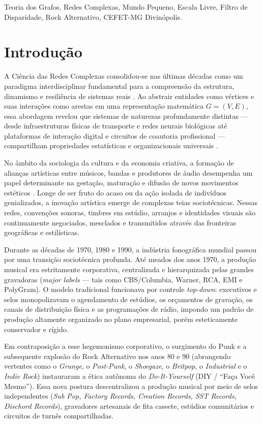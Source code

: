 \documentclass[conference]{IEEEtran}
\begin{document}
\begin{IEEEkeywords}
Teoria dos Grafos, Redes Complexas, Mundo Pequeno, Escala Livre, Filtro de Disparidade, Rock Alternativo, CEFET-MG Divinópolis.
\end{IEEEkeywords}

\section{Introdução}

A Ciência das Redes Complexas consolidou-se nas últimas décadas como um paradigma interdisciplinar fundamental para a compreensão da estrutura, dinamismo e resiliência de sistemas reais \cite{barabasi1999}. Ao abstrair entidades como vértices e suas interações como arestas em uma representação matemática $G=(V, E)$, essa abordagem revelou que sistemas de naturezas profundamente distintas --- desde infraestruturas físicas de transporte e redes neurais biológicas até plataformas de interação digital e circuitos de coautoria profissional --- compartilham propriedades estatísticas e organizacionais universais \cite{watts1998}.

No âmbito da sociologia da cultura e da economia criativa, a formação de alianças artísticas entre músicos, bandas e produtores de áudio desempenha um papel determinante na gestação, maturação e difusão de novos movimentos estéticos \cite{gleiser2003}. Longe de ser fruto do acaso ou da ação isolada de indivíduos genializados, a inovação artística emerge de complexas teias sociotécnicas. Nessas redes, convenções sonoras, timbres em estúdio, arranjos e identidades visuais são continuamente negociados, mesclados e transmitidos através das fronteiras geográficas e estilísticas.

Durante as décadas de 1970, 1980 e 1990, a indústria fonográfica mundial passou por uma transição sociotécnica profunda. Até meados dos anos 1970, a produção musical era estritamente corporativa, centralizada e hierarquizada pelas grandes gravadoras (\textit{major labels} --- tais como CBS/Columbia, Warner, RCA, EMI e PolyGram). O modelo tradicional funcionava por controle \textit{top-down}: executivos e selos monopolizavam o agendamento de estúdios, os orçamentos de gravação, os canais de distribuição física e as programações de rádio, impondo um padrão de produção altamente organizado no plano empresarial, porém esteticamente conservador e rígido.

Em contraposição a esse hegemonismo corporativo, o surgimento do Punk e a subsequente explosão do Rock Alternativo nos anos 80 e 90 (abrangendo vertentes como o \textit{Grunge}, o \textit{Post-Punk}, o \textit{Shoegaze}, o \textit{Britpop}, o \textit{Industrial} e o \textit{Indie Rock}) instauraram a ética autônoma do \textit{Do-It-Yourself} (DIY / ``Faça Você Mesmo''). Essa nova postura descentralizou a produção musical por meio de selos independentes (\textit{Sub Pop, Factory Records, Creation Records, SST Records, Dischord Records}), gravadores artesanais de fita cassete, estúdios comunitários e circuitos de turnês compartilhadas.
\end{document}
